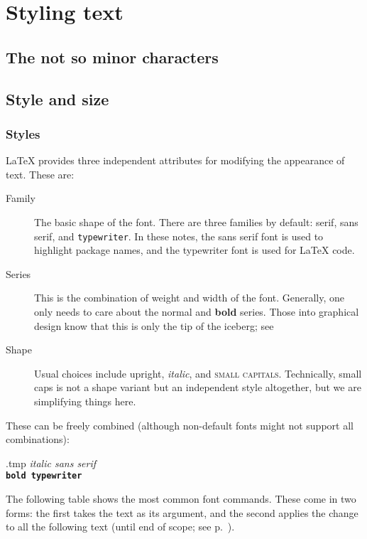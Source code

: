 \chapter{Styling text}

%
%
%
\section{The not so minor characters}


%
%
%
\section{Style and size}

\subsection{Styles}
\LaTeX{} provides three independent attributes for modifying the appearance of text.
These are:

\begin{description}
\item[Family] The basic shape of the font.
    There are three families by default: serif, \textsf{sans serif}, and \texttt{typewriter}.
    In these notes, the sans serif font is used to highlight package names,
    and the typewriter font is used for \LaTeX{} code.

\item[Series] This is the combination of weight and width of the font.
    Generally, one only needs to care about the normal and \textbf{bold} series.
    Those into graphical design know that this is only the tip of the iceberg;
    see 

\item[Shape] Usual choices include upright, \textit{italic}, and \textsc{small capitals}.
    Technically, small caps is not a shape variant but an independent style altogether,
    but we are simplifying things here.
\end{description}

These can be freely combined (although non-default fonts might not support all combinations):
%
\begin{VerbatimOut}{\jobname.tmp}
\textsf{\textit{italic sans serif}}\\
\textbf{\texttt{bold typewriter}}
\end{VerbatimOut}
\ShowExample

The following table shows the most common font commands.
These come in two forms: the first takes the text as its argument,
and the second applies the change to all the following text
(until end of scope; see p.~\pageref{ex:font scope}).

